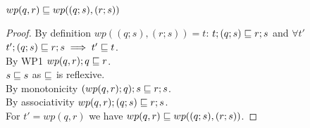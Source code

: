 \documentclass{article}
\begin{document}
\begin{theorem}
$wp(q, r) \sqsubseteq wp((q; s), (r; s))$
\end{theorem}

\begin{proof}
By definition $wp((q; s), (r; s)) = t$: $t; (q; s) \sqsubseteq r; s$ and $\forall t'$ $t'; (q; s) \sqsubseteq r; s \implies t' \sqsubseteq t$.\\
By WP1 $wp(q, r); q \sqsubseteq r$.\\
$s \sqsubseteq s$ as $\sqsubseteq$ is reflexive.\\
By monotonicity $(wp(q, r); q); s \sqsubseteq r; s$.\\
By associativity $wp(q, r); (q; s) \sqsubseteq r; s$.\\
For $t' = wp(q, r)$ we have $wp(q, r) \sqsubseteq wp((q; s), (r; s))$.
\end{proof}
\end{document}
